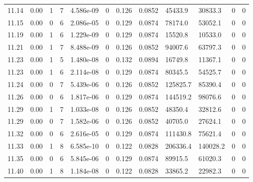 \documentclass[preview]{standalone}
\begin{document}
{{{{{{{{{{{{{\begin{tabular}{L{1.2cm}C{1.2cm} C{0.3cm}C{0.5cm} C{1.4cm}C{1.4cm} C{1.4cm}C{1.4cm} C{1.6cm}C{1.6cm} C{1.6cm}C{1.6cm}}
  11.14  &  0.00  & 1     &  7 &  4.586e-09  & 0  &  0.126&   0.0852& 45433.9 & 30833.3   &  0 & 0  \\ 
  11.15  &  0.00  & 0     &  6 &  2.086e-05  & 0  &  0.129&   0.0874& 78174.0 & 53052.1   &  0 & 0  \\ 
  11.19  &  0.00  & 1     &  6 &  1.229e-09  & 0  &  0.129&   0.0874& 15520.8 & 10533.0   &  0 & 0  \\ 
  11.21  &  0.00  & 1     &  7 &  8.488e-09  & 0  &  0.126&   0.0852& 94007.6 & 63797.3   &  0 & 0  \\ 
  11.23  &  0.00  & 1     &  5 &  1.480e-08  & 0  &  0.132&   0.0894& 16749.8 & 11367.1   &  0 & 0  \\ 
  11.23  &  0.00  & 1     &  6 &  2.114e-08  & 0  &  0.129&   0.0874& 80345.5 & 54525.7   &  0 & 0  \\ 
  11.24  &  0.00  & 0     &  7 &  5.439e-06  & 0  &  0.126&   0.0852& 125825.7 & 85390.4   &  0 & 0  \\ 
  11.26  &  0.00  & 0     &  6 &  1.817e-06  & 0  &  0.129&   0.0874& 144519.2 & 98076.6   &  0 & 0  \\ 
  11.29  &  0.00  & 1     &  7 &  1.033e-08  & 0  &  0.126&   0.0852& 48350.4 & 32812.6   &  0 & 0  \\ 
  11.29  &  0.00  & 0     &  7 &  1.582e-06  & 0  &  0.126&   0.0852& 40705.0 & 27624.1   &  0 & 0  \\ 
  11.32  &  0.00  & 0     &  6 &  2.616e-05  & 0  &  0.129&   0.0874& 111430.8 & 75621.4   &  0 & 0  \\ 
  11.33  &  0.00  & 1     &  8 &  6.585e-10  & 0  &  0.122&   0.0828& 206336.4 & 140028.2   &  0 & 0  \\ 
  11.35  &  0.00  & 0     &  6 &  5.845e-06  & 0  &  0.129&   0.0874& 89915.5 & 61020.3   &  0 & 0  \\ 
  11.40  &  0.00  & 1     &  8 &  1.184e-08  & 0  &  0.122&   0.0828& 33865.2 & 22982.3   &  0 & 0  \\ 
\hline 
\end{tabular} 

}}}}}}}}}}}}}
\end{document}
